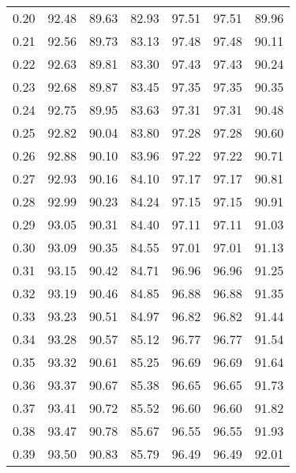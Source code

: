 \begin{tabular}{|c|c|c|c|c|c|c|}
      0.20 &     92.48 &     89.63 &      82.93 &   97.51 &      97.51 &         89.96 \\
      0.21 &     92.56 &     89.73 &      83.13 &   97.48 &      97.48 &         90.11 \\
      0.22 &     92.63 &     89.81 &      83.30 &   97.43 &      97.43 &         90.24 \\
      0.23 &     92.68 &     89.87 &      83.45 &   97.35 &      97.35 &         90.35 \\
      0.24 &     92.75 &     89.95 &      83.63 &   97.31 &      97.31 &         90.48 \\
      0.25 &     92.82 &     90.04 &      83.80 &   97.28 &      97.28 &         90.60 \\
      0.26 &     92.88 &     90.10 &      83.96 &   97.22 &      97.22 &         90.71 \\
      0.27 &     92.93 &     90.16 &      84.10 &   97.17 &      97.17 &         90.81 \\
      0.28 &     92.99 &     90.23 &      84.24 &   97.15 &      97.15 &         90.91 \\
      0.29 &     93.05 &     90.31 &      84.40 &   97.11 &      97.11 &         91.03 \\
      0.30 &     93.09 &     90.35 &      84.55 &   97.01 &      97.01 &         91.13 \\
      0.31 &     93.15 &     90.42 &      84.71 &   96.96 &      96.96 &         91.25 \\
      0.32 &     93.19 &     90.46 &      84.85 &   96.88 &      96.88 &         91.35 \\
      0.33 &     93.23 &     90.51 &      84.97 &   96.82 &      96.82 &         91.44 \\
      0.34 &     93.28 &     90.57 &      85.12 &   96.77 &      96.77 &         91.54 \\
      0.35 &     93.32 &     90.61 &      85.25 &   96.69 &      96.69 &         91.64 \\
      0.36 &     93.37 &     90.67 &      85.38 &   96.65 &      96.65 &         91.73 \\
      0.37 &     93.41 &     90.72 &      85.52 &   96.60 &      96.60 &         91.82 \\
      0.38 &     93.47 &     90.78 &      85.67 &   96.55 &      96.55 &         91.93 \\
      0.39 &     93.50 &     90.83 &      85.79 &   96.49 &      96.49 &         92.01 \\

\end{tabular}
